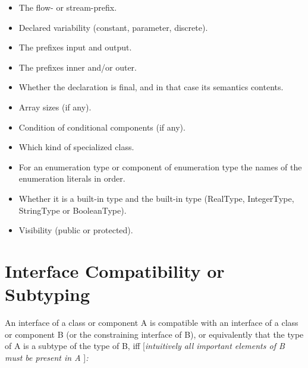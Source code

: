\documentclass[10pt,a4paper]{report}
\def\doublelabel#1{\label{#1}}
\begin{document}
\begin{itemize}
  \begin{itemize}
  \item
    The flow- or stream-prefix.
  \item
    Declared variability (constant, parameter, discrete).
  \item
    The prefixes input and output.
  \item
    The prefixes inner and/or outer.
  \item
    Whether the declaration is final, and in that case its semantics
    contents.
  \item
    Array sizes (if any).
  \item
    Condition of conditional components (if any).
  \item
    Which kind of specialized class.
  \item
    For an enumeration type or component of enumeration type the names
    of the enumeration literals in order.
  \item
    Whether it is a built-in type and the built-in type (RealType,
    IntegerType, StringType or BooleanType).
  \item
    Visibility (public or protected).
  \end{itemize}
\end{itemize}

\section{Interface Compatibility or Subtyping}\doublelabel{interface-compatibility-or-subtyping}

An interface of a class or component A is compatible with an interface
of a class or component B (or the constraining interface of B), or
equivalently that the type of A is a subtype of the type of B, iff
{[}\emph{intuitively all important elements of B must be present in A}
{]}\emph{:}
\end{document}

